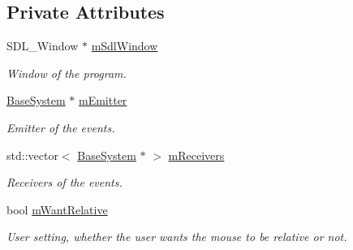 \subsection*{Private Attributes}
\begin{DoxyCompactItemize}
\item 
\mbox{\label{class_common_1_1_sdl_input_handler_a75f371e1643d00fd43a6fb8c6f8bae27}} 
S\+D\+L\+\_\+\+Window $\ast$ \hyperlink{class_common_1_1_sdl_input_handler_a75f371e1643d00fd43a6fb8c6f8bae27}{m\+Sdl\+Window}
\begin{DoxyCompactList}\small\item\em Window of the program. \end{DoxyCompactList}\item 
\mbox{\label{class_common_1_1_sdl_input_handler_a1b8a4b9d360bfe89087e00f3b7ae7fff}} 
\hyperlink{class_common_1_1_base_system}{Base\+System} $\ast$ \hyperlink{class_common_1_1_sdl_input_handler_a1b8a4b9d360bfe89087e00f3b7ae7fff}{m\+Emitter}
\begin{DoxyCompactList}\small\item\em Emitter of the events. \end{DoxyCompactList}\item 
\mbox{\label{class_common_1_1_sdl_input_handler_ad4debf0c68c6187b7fddcec3af1a0913}} 
std\+::vector$<$ \hyperlink{class_common_1_1_base_system}{Base\+System} $\ast$ $>$ \hyperlink{class_common_1_1_sdl_input_handler_ad4debf0c68c6187b7fddcec3af1a0913}{m\+Receivers}
\begin{DoxyCompactList}\small\item\em Receivers of the events. \end{DoxyCompactList}\item 
\mbox{\label{class_common_1_1_sdl_input_handler_a821df0693764a084ec20b1087b796897}} 
bool \hyperlink{class_common_1_1_sdl_input_handler_a821df0693764a084ec20b1087b796897}{m\+Want\+Relative}
\begin{DoxyCompactList}\small\item\em User setting, whether the user wants the mouse to be relative or not. \end{DoxyCompactList}\item 
\mbox{\label{class_common_1_1_sdl_input_handler_a97824bb249c9debfd331171ad3d27c01}} 

\end{DoxyCompactItemize}

